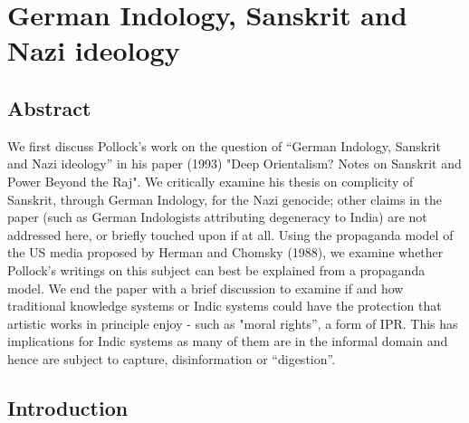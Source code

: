 \chapter{German Indology, Sanskrit and Nazi ideology}\label{chapter1}
\vskip -10pt

\vskip -10pt

\section*{Abstract}

We first discuss Pollock’s work on the question of “German Indology, Sanskrit and Nazi ideology” in his paper (1993) "Deep Orientalism? Notes on Sanskrit and Power Beyond the Raj". We critically examine his thesis on complicity of Sanskrit, through German Indology, for the Nazi genocide; other claims in the paper (such as German Indologists attributing degeneracy to India) are not addressed here, or briefly touched upon if at all. Using the propaganda model of the US media proposed by Herman and Chomsky (1988), we examine whether Pollock’s writings on this subject can best be explained from a propaganda model.  We end the paper with a brief discussion to examine if and how traditional knowledge systems or Indic systems could have the protection that artistic works in principle enjoy - such as "moral rights”, a form of IPR. This has implications for Indic systems as many of them are in the informal domain and hence are subject to capture, disinformation or “digestion”.

\vskip -10pt


\section*{Introduction}

